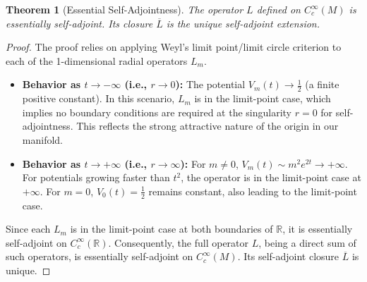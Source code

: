 \documentclass[12pt]{article}
\newtheorem{theorem}{Theorem}[section]
\begin{document}
\begin{theorem}[Essential Self-Adjointness]
The operator $L$ defined on $C_c^\infty(M)$ is essentially self-adjoint. Its closure $\overline{L}$ is the unique self-adjoint extension.
\end{theorem}
\begin{proof}
The proof relies on applying Weyl's limit point/limit circle criterion to each of the 1-dimensional radial operators $L_m$.
\begin{itemize}
    \item \textbf{Behavior as $t \to -\infty$ (i.e., $r \to 0$):} The potential $V_m(t) \to \frac{1}{2}$ (a finite positive constant). In this scenario, $L_m$ is in the limit-point case, which implies no boundary conditions are required at the singularity $r=0$ for self-adjointness. This reflects the strong attractive nature of the origin in our manifold.
    \item \textbf{Behavior as $t \to +\infty$ (i.e., $r \to \infty$):} For $m \neq 0$, $V_m(t) \sim m^2 e^{2t} \to +\infty$. For potentials growing faster than $t^2$, the operator is in the limit-point case at $+\infty$. For $m = 0$, $V_0(t) = \frac{1}{2}$ remains constant, also leading to the limit-point case.
\end{itemize}
Since each $L_m$ is in the limit-point case at both boundaries of $\mathbb{R}$, it is essentially self-adjoint on $C_c^\infty(\mathbb{R})$. Consequently, the full operator $L$, being a direct sum of such operators, is essentially self-adjoint on $C_c^\infty(M)$. Its self-adjoint closure $\overline{L}$ is unique.
\end{proof}
\end{document}
